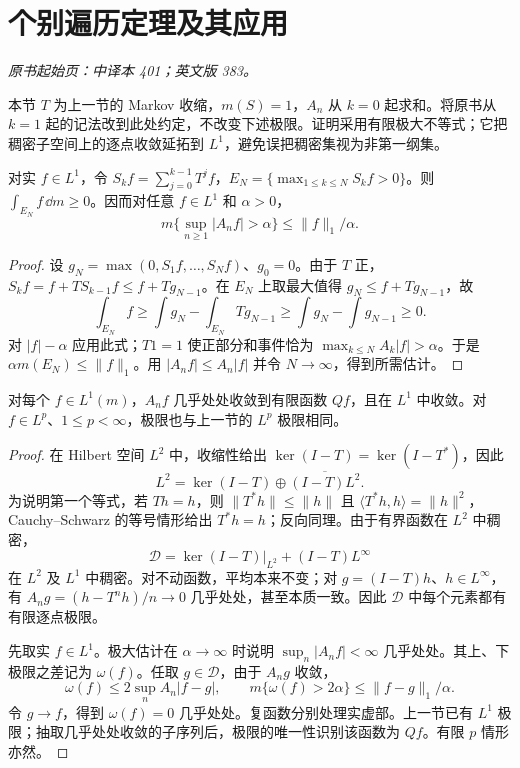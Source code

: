 \section{个别遍历定理及其应用}\label{sec:yosida-13-02}
\noindent\textit{原书起始页：中译本 401；英文版 383。}

本节 $T$ 为上一节的 Markov 收缩，$m(S)=1$，$A_n$ 从 $k=0$ 起求和。将原书从 $k=1$ 起的记法改到此处约定，不改变下述极限。证明采用有限极大不等式；它把稠密子空间上的逐点收敛延拓到 $L^1$，避免误把稠密集视为非第一纲集。

\begin{lemma}\label{lem:y13-hopf-maximal}
对实 $f\in L^1$，令 $S_kf=\sum_{j=0}^{k-1}T^jf$，$E_N=\{\max_{1\le k\le N}S_kf>0\}$。则 $\int_{E_N}f\,\dd m\ge0$。因而对任意 $f\in L^1$ 和 $\alpha>0$，
\begin{equation}\label{eq:y13-maximal-weak}
 m\{\sup_{n\ge1}|A_nf|>\alpha\}\le\|f\|_1/\alpha.
\end{equation}
\end{lemma}
\begin{proof}
设 $g_N=\max(0,S_1f,\ldots,S_Nf)$、$g_0=0$。由于 $T$ 正，$S_kf=f+TS_{k-1}f\le f+Tg_{N-1}$。在 $E_N$ 上取最大值得 $g_N\le f+Tg_{N-1}$，故
\[
 \int_{E_N}f\ge\int g_N-\int_{E_N}Tg_{N-1}
 \ge\int g_N-\int g_{N-1}\ge0.
\]
对 $|f|-\alpha$ 应用此式；$T1=1$ 使正部分和事件恰为 $\max_{k\le N}A_k|f|>\alpha$。于是 $\alpha m(E_N)\le\|f\|_1$。用 $|A_nf|\le A_n|f|$ 并令 $N\to\infty$，得到所需估计。
\end{proof}

\begin{theorem}\label{thm:y13-individual}
对每个 $f\in L^1(m)$，$A_nf$ 几乎处处收敛到有限函数 $Qf$，且在 $L^1$ 中收敛。对 $f\in L^p$、$1\le p<\infty$，极限也与上一节的 $L^p$ 极限相同。
\end{theorem}
\begin{proof}
在 Hilbert 空间 $L^2$ 中，收缩性给出 $\ker(I-T)=\ker(I-T^*)$，因此
\[
 L^2=\ker(I-T)\oplus\overline{(I-T)L^2}.
\]
为说明第一个等式，若 $Th=h$，则 $\|T^*h\|\le\|h\|$ 且 $\langle T^*h,h\rangle=\|h\|^2$，Cauchy--Schwarz 的等号情形给出 $T^*h=h$；反向同理。由于有界函数在 $L^2$ 中稠密，
\[
 \mathcal D=\ker(I-T)|_{L^2}+(I-T)L^\infty
\]
在 $L^2$ 及 $L^1$ 中稠密。对不动函数，平均本来不变；对 $g=(I-T)h$、$h\in L^\infty$，有 $A_ng=(h-T^nh)/n\to0$ 几乎处处，甚至本质一致。因此 $\mathcal D$ 中每个元素都有有限逐点极限。

先取实 $f\in L^1$。极大估计在 $\alpha\to\infty$ 时说明 $\sup_n|A_nf|<\infty$ 几乎处处。其上、下极限之差记为 $\omega(f)$。任取 $g\in\mathcal D$，由于 $A_ng$ 收敛，
\[
 \omega(f)\le2\sup_n A_n|f-g|,
 \qquad m\{\omega(f)>2\alpha\}\le\|f-g\|_1/\alpha.
\]
令 $g\to f$，得到 $\omega(f)=0$ 几乎处处。复函数分别处理实虚部。上一节已有 $L^1$ 极限；抽取几乎处处收敛的子序列后，极限的唯一性识别该函数为 $Qf$。有限 $p$ 情形亦然。
\end{proof}

